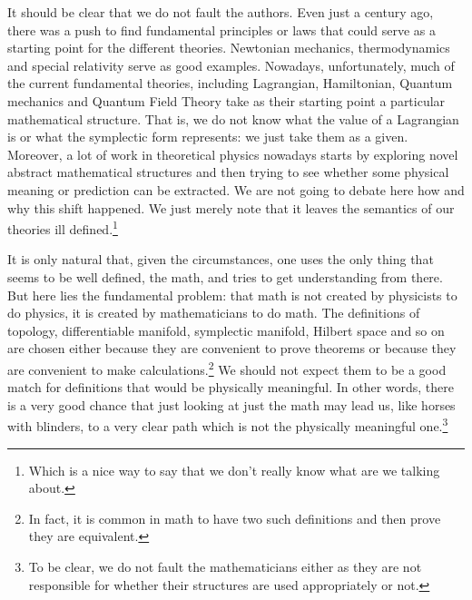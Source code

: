 \documentclass[11pt]{article}
\begin{document}
It should be clear that we do not fault the authors. Even just a century ago, there was a push to find fundamental principles or laws that could serve as a starting point for the different theories. Newtonian mechanics, thermodynamics and special relativity serve as good examples. Nowadays, unfortunately, much of the current fundamental theories, including Lagrangian, Hamiltonian, Quantum mechanics and Quantum Field Theory take as their starting point a particular mathematical structure. That is, we do not know what the value of a Lagrangian is or what the symplectic form represents: we just take them as a given. Moreover, a lot of work in theoretical physics nowadays starts by exploring novel abstract mathematical structures and then trying to see whether some physical meaning or prediction can be extracted. We are not going to debate here how and why this shift happened. We just merely note that it leaves the semantics of our theories ill defined.\footnote{Which is a nice way to say that we don't really know what are we talking about.} 

It is only natural that, given the circumstances, one uses the only thing that seems to be well defined, the math, and tries to get understanding from there. But here lies the fundamental problem: that math is not created by physicists to do physics, it is created by mathematicians to do math. The definitions of topology, differentiable manifold, symplectic manifold, Hilbert space and so on are chosen either because they are convenient to prove theorems or because they are convenient to make calculations.\footnote{In fact, it is common in math to have two such definitions and then prove they are equivalent.} We should not expect them to be a good match for definitions that would be physically meaningful. In other words, there is a very good chance that just looking at just the math may lead us, like horses with blinders, to a very clear path which is not the physically meaningful one.\footnote{To be clear, we do not fault the mathematicians either as they are not responsible for whether their structures are used appropriately or not.}
\end{document}
